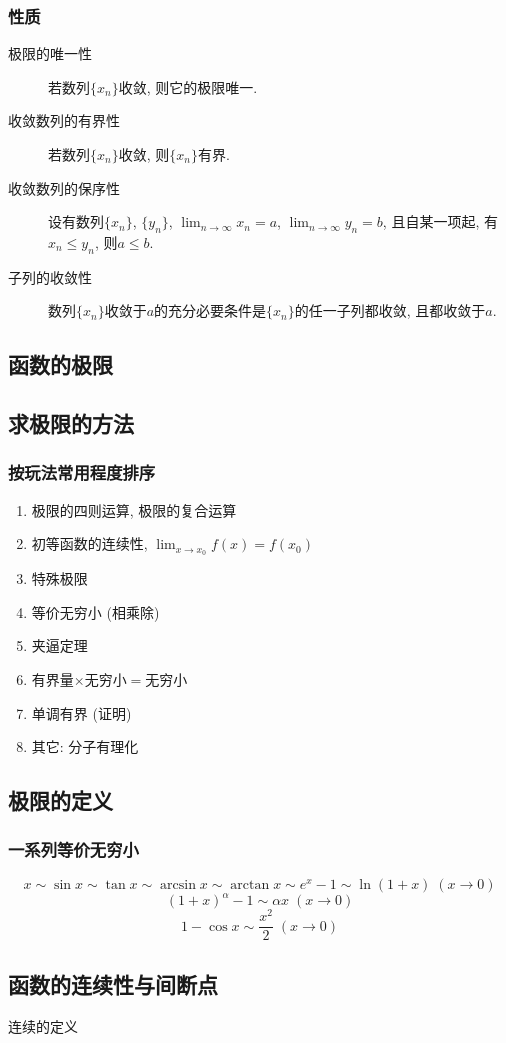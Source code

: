 \subsubsection{性质}
\begin{description}
\item[极限的唯一性] 若数列\(\{x_n\}\)收敛, 则它的极限唯一.
\item[收敛数列的有界性] 若数列\(\{x_n\}\)收敛, 则\(\{x_n\}\)有界.
\item[收敛数列的保序性] 设有数列\(\{x_n\}\), \(\{y_n\}\), \(\displaystyle\lim_{n\to\infty}x_n=a\), \(\displaystyle\lim_{n\to\infty}y_n=b\), 且自某一项起, 有\(x_n\le y_n\), 则\(a\le b\).
\item[子列的收敛性] 数列\(\{x_n\}\)收敛于\(a\)的充分必要条件是\(\{x_n\}\)的任一子列都收敛, 且都收敛于\(a\).
\end{description}

\subsection{函数的极限}

\subsection{求极限的方法}
\subsubsection{按玩法常用程度排序}
\begin{enumerate}
\item 极限的四则运算, 极限的复合运算
\item 初等函数的连续性, \(\displaystyle\lim_{x\to x_0}f(x)=f(x_0)\)
\item 特殊极限
\item 等价无穷小 (相乘除)
\item 夹逼定理
\item 有界量\(\times\)无穷小\(=\)无穷小
\item 单调有界 (证明)
\item 其它: 分子有理化
\end{enumerate}

\subsection{极限的定义}

\subsubsection{一系列等价无穷小}
\[\displaystyle x\sim\sin x\sim\tan x\sim\arcsin x\sim\arctan x\sim e^x-1\sim\ln(1+x)\;(x\to 0)\]
\[(1+x)^\alpha-1\sim\alpha x\;(x\to 0)\]
\[1-\cos x\sim\frac{x^2}{2}\;(x\to 0)\]

\subsection{函数的连续性与间断点}
连续的定义
